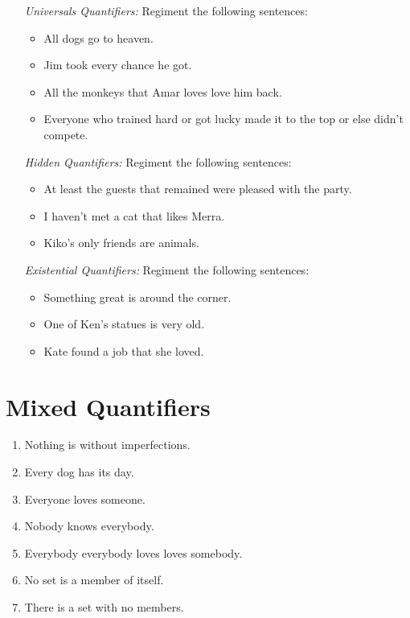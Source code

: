 \documentclass[a4paper, 11pt]{article} %
\begin{document}
\begin{enumerate}
  \item[\it Universals Quantifiers:] Regiment the following sentences:
    \begin{itemize}
      \item All dogs go to heaven.
      \item Jim took every chance he got.
      \item All the monkeys that Amar loves love him back.
      \item Everyone who trained hard or got lucky made it to the top or else didn't compete.
    \end{itemize}
  \item[\it Hidden Quantifiers:] Regiment the following sentences:
    \begin{itemize}
      \item At least the guests that remained were pleased with the party.
      \item I haven't met a cat that likes Merra.
      \item Kiko's only friends are animals.
    \end{itemize}
  \item[\it Existential Quantifiers:] Regiment the following sentences: 
    \begin{itemize}
      \item Something great is around the corner.
      \item One of Ken's statues is very old.
      \item Kate found a job that she loved.
    \end{itemize}
\end{enumerate}





\section*{Mixed Quantifiers}

\begin{enumerate}
  \item Nothing is without imperfections.
  \item Every dog has its day.
  \item Everyone loves someone.
  \item Nobody knows everybody.
  \item Everybody everybody loves loves somebody.
  \item No set is a member of itself.
  \item There is a set with no members.
\end{enumerate}
\end{document}
